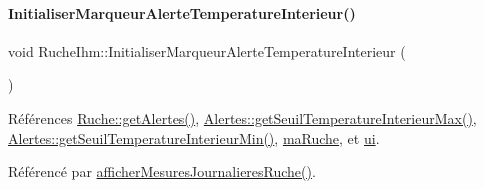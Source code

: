 \paragraph{\texorpdfstring{Initialiser\+Marqueur\+Alerte\+Temperature\+Interieur()}{InitialiserMarqueurAlerteTemperatureInterieur()}}
{\footnotesize\ttfamily void Ruche\+Ihm\+::\+Initialiser\+Marqueur\+Alerte\+Temperature\+Interieur (\begin{DoxyParamCaption}{ }\end{DoxyParamCaption})\hspace{0.3cm}{\ttfamily [private]}}



Références \hyperlink{class_ruche_a9edbc2e81ccb2cb76de43639bcb16ec1}{Ruche\+::get\+Alertes()}, \hyperlink{class_alertes_ac514ebef5e7e65aa7bee0ebe3cd7e883}{Alertes\+::get\+Seuil\+Temperature\+Interieur\+Max()}, \hyperlink{class_alertes_af61b11556d97f923cf7dd25ac4f5dd05}{Alertes\+::get\+Seuil\+Temperature\+Interieur\+Min()}, \hyperlink{class_ruche_ihm_a43a6b1fa31f4fba58d919daae3707b38}{ma\+Ruche}, et \hyperlink{class_ruche_ihm_a64786058bd7f88ca2f1e9743bb27c25b}{ui}.



Référencé par \hyperlink{class_ruche_ihm_a94bd98327a73a15aad1306fc31f53ce8}{afficher\+Mesures\+Journalieres\+Ruche()}.


